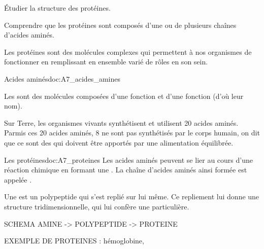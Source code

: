 \tetePremStssStru


\begin{objectifs}
  \item Étudier la structure des protéines.
  \item Comprendre que les protéines sont composés d'une ou de plusieurs chaînes d'acides aminés.
\end{objectifs}

\begin{contexte}
  Les protéines sont des molécules complexes qui permettent à nos organismes de fonctionner en remplissant en ensemble varié de rôles en son sein.

\end{contexte}



\begin{doc}{Acides aminés}{doc:A7_acides_amines}
  \begin{encart}
    Les  sont des molécules composées d'une fonction  et d'une fonction  (d'où leur nom).
  \end{encart}
  Sur Terre, les organismes vivants synthétisent et utilisent 20 acides aminés.
  Parmis ces 20 acides aminés, 8 ne sont pas synthétisés par le corps humain, on dit que ce sont des  qui doivent être apportés par une alimentation équilibrée.
\end{doc}

\begin{doc}{Les protéines}{doc:A7_proteines}
  Les acides aminés peuvent se lier au cours d'une réaction chimique en formant une .
  La chaîne d'acides aminés ainsi formée est appelée .

  \begin{encart}
    Une  est un polypeptide qui s'est replié sur lui même.
    Ce repliement lui donne une structure tridimensionnelle, qui lui confère une  particulière.
  \end{encart}
  SCHEMA AMINE -> POLYPEPTIDE -> PROTEINE
  
  EXEMPLE DE PROTEINES : hémoglobine, 
\end{doc}



\numeroQuestion

\mesure
